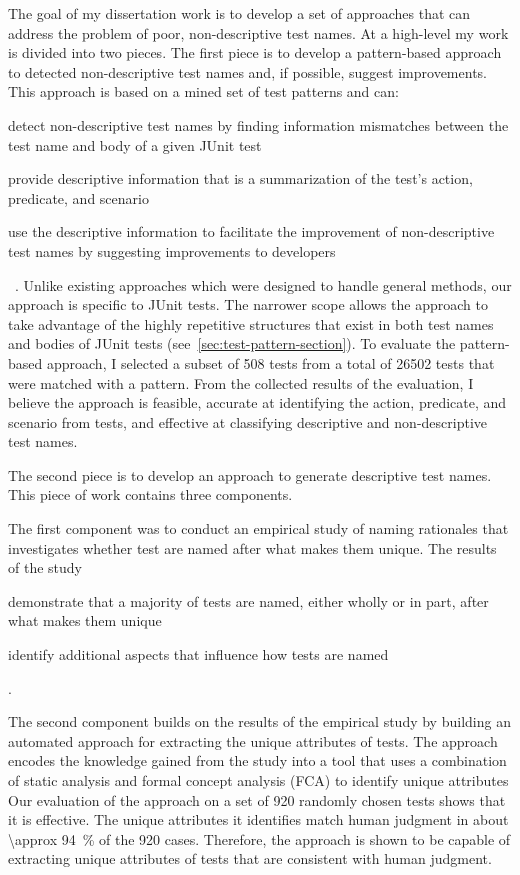 The goal of my dissertation work is to develop a set of approaches that can address the problem of poor, non-descriptive test names.
%
At a high-level my work is divided into two pieces.
%
The first piece is to develop a pattern-based approach to detected non-descriptive test names and, if possible, suggest improvements.
%
This approach is based on a mined set of test patterns and can:
%
\begin{enumerate*}
\item detect non-descriptive test names by finding information mismatches between the test name and body of a given JUnit test
\item provide descriptive information that is a summarization of the test's action, predicate, and scenario
\item use the descriptive information to facilitate the improvement of non-descriptive test names by suggesting improvements to developers
\end{enumerate*}~\cite{wu2020pattern}.
%
Unlike existing approaches which were designed to handle general methods, our approach is specific to JUnit tests.
%
The narrower scope allows the approach to take advantage of the highly repetitive structures that exist in both test names and bodies of JUnit tests (see~\cref{sec:test-pattern-section}).
To evaluate the pattern-based approach, I selected a subset of \num{508} tests from a total of \num{26502} tests that were matched with a pattern.
%
From the collected results of the evaluation, I believe the approach is feasible, accurate at identifying the action, predicate, and
scenario from tests, and effective at classifying descriptive and
non-descriptive test names.


The second piece is to develop an approach to generate descriptive test names.
% 
This piece of work contains three components.


The first component was to conduct an empirical study of naming rationales that investigates whether test are named after what makes them unique.
%
The results of the study
\begin{enumerate*}
\item demonstrate that a majority of tests are named, either wholly or in part, after what makes them unique
\item identify additional aspects that influence how tests are named
\end{enumerate*}.


The second component builds on the results of the empirical study by building an automated approach for extracting the unique attributes of tests.
% 
The approach encodes the knowledge gained from the study into a tool that uses a combination of static analysis and formal concept analysis (FCA) to identify unique attributes 
%
Our evaluation of the approach on a set of \num{920} randomly chosen tests shows that it is effective.
%
The unique attributes it identifies match human judgment in about \SI{\approx 94}{\percent} of the \num{920} cases.
%
Therefore, the approach is shown to be capable of extracting unique attributes of tests that are consistent with human judgment.


